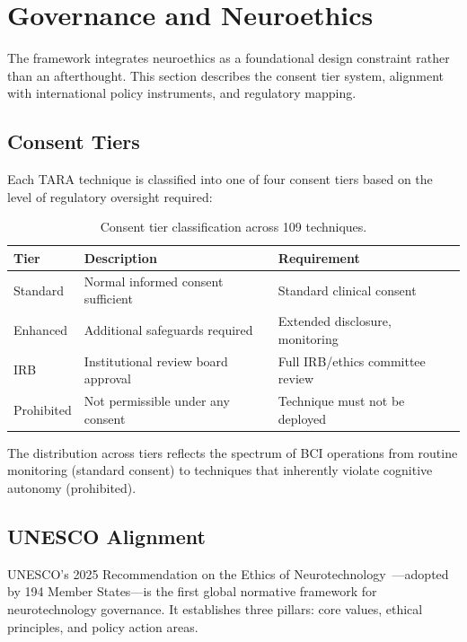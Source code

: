 
\section{Governance and Neuroethics}
\label{sec:governance}

The \qif framework integrates neuroethics as a foundational design constraint
rather than an afterthought. This section describes the consent tier system,
alignment with international policy instruments, and regulatory mapping.

\subsection{Consent Tiers}

Each TARA technique is classified into one of four consent tiers based on the
level of regulatory oversight required:

\begin{table}[H]
\centering
\caption{Consent tier classification across 109 techniques.}
\label{tab:consent}
\small
\begin{tabular}{@{}l l l@{}}
\toprule
\textbf{Tier} & \textbf{Description} & \textbf{Requirement} \\
\midrule
Standard   & Normal informed consent sufficient & Standard clinical consent \\
Enhanced   & Additional safeguards required     & Extended disclosure, monitoring \\
IRB        & Institutional review board approval & Full IRB/ethics committee review \\
Prohibited & Not permissible under any consent  & Technique must not be deployed \\
\bottomrule
\end{tabular}
\end{table}

The distribution across tiers reflects the spectrum of BCI operations from routine
monitoring (standard consent) to techniques that inherently violate cognitive
autonomy (prohibited).

\subsection{UNESCO Alignment}

UNESCO's 2025 Recommendation on the Ethics of
Neurotechnology~\cite{unesco2025recommendation}---adopted by 194 Member States---is
the first global normative framework for neurotechnology governance. It establishes
three pillars: core values, ethical principles, and policy action areas.

